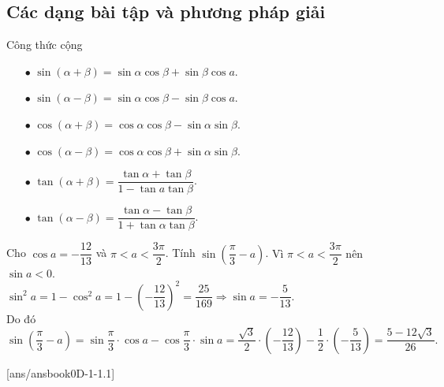 \subsection{Các dạng bài tập và phương pháp giải}

\begin{dang}{Công thức cộng}
	\begin{itemize}
		\item[$\bullet$] $\sin (\alpha + \beta)=\sin \alpha\cos \beta+ \sin \beta\cos a$.
		\item[$\bullet$] $\sin (\alpha - \beta)=\sin \alpha\cos \beta-\sin \beta\cos a$.
		\item[$\bullet$] $\cos (\alpha + \beta)=\cos \alpha\cos \beta - \sin \alpha\sin \beta$.
		\item[$\bullet$] $\cos (\alpha - \beta)=\cos \alpha\cos \beta +\sin \alpha\sin \beta$.
		\item[$\bullet$] $\tan (\alpha + \beta)=\dfrac{\tan \alpha + \tan \beta}{1-\tan a\tan \beta}$.
		\item[$\bullet$] $\tan (\alpha - \beta)=\dfrac{\tan \alpha - \tan \beta}{1+\tan \alpha\tan \beta}$.
	\end{itemize}
\end{dang}

\VDMH

\begin{vd}
Cho $\cos a=-\dfrac{12}{13}$ và $\pi<a<\dfrac{3\pi}{2}$.
Tính $\sin\left(\dfrac{\pi}{3}-a\right)$.
\loigiai
{
Vì $\pi<a<\dfrac{3\pi}{2}$ nên $\sin a<0$.\\
$\sin^{2}a=1-\cos^{2}a=1-\left(-\dfrac{12}{13}\right)^2=\dfrac{25}{169} \Rightarrow \sin a=-\dfrac{5}{13}$.\\
Do đó \\
$\sin\left(\dfrac{\pi}{3}-a\right)=\sin\dfrac{\pi}{3}\cdot\cos a-\cos\dfrac{\pi}{3}\cdot\sin a=\dfrac{\sqrt{3}}{2}\cdot\left(-\dfrac{12}{13}\right)-\dfrac{1}{2}\cdot \left(-\dfrac{5}{13}\right)=\dfrac{5-12\sqrt{3}}{26}.$
}
\end{vd}

\BTVD

[ans/ansbook0D-1-1.1]



\HDG



